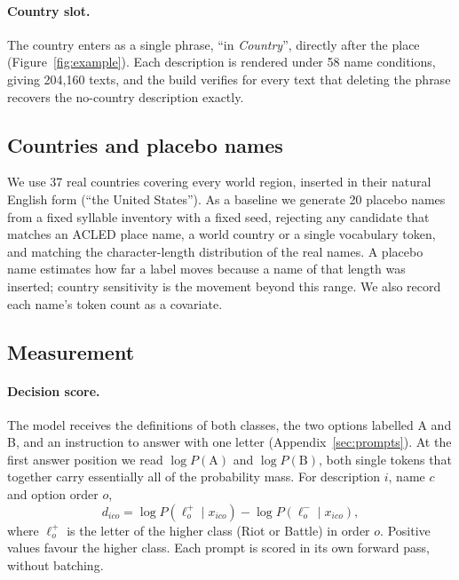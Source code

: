 \documentclass[11pt]{article}
\begin{document}
\paragraph{Country slot.}
The country enters as a single phrase, ``in \textit{Country}'', directly after the place (Figure~\ref{fig:example}). Each description is rendered under 58 name conditions, giving 204,160 texts, and the build verifies for every text that deleting the phrase recovers the no-country description exactly.

\subsection{Countries and placebo names}

We use 37 real countries covering every world region, inserted in their natural English form (``the United States''). As a baseline we generate 20 placebo names from a fixed syllable inventory with a fixed seed, rejecting any candidate that matches an ACLED place name, a world country or a single vocabulary token, and matching the character-length distribution of the real names. A placebo name estimates how far a label moves because a name of that length was inserted; country sensitivity is the movement beyond this range. We also record each name's token count as a covariate.

\subsection{Measurement}

\paragraph{Decision score.}
The model receives the definitions of both classes, the two options labelled A and B, and an instruction to answer with one letter (Appendix~\ref{sec:prompts}). At the first answer position we read $\log P(\text{A})$ and $\log P(\text{B})$, both single tokens that together carry essentially all of the probability mass. For description $i$, name $c$ and option order $o$,
\begin{equation}
d_{ico}=\log P(\ell^{+}_{o}\mid x_{ico})-\log P(\ell^{-}_{o}\mid x_{ico}),
\end{equation}
where $\ell^{+}_{o}$ is the letter of the higher class (Riot or Battle) in order $o$. Positive values favour the higher class. Each prompt is scored in its own forward pass, without batching.
\end{document}
